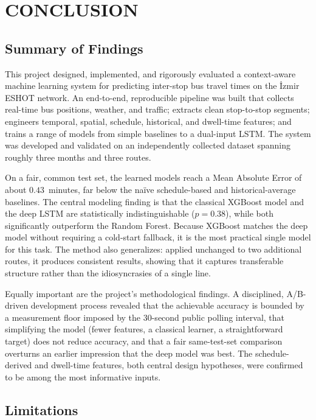 \chapter{CONCLUSION}

\section{Summary of Findings}

This project designed, implemented, and rigorously evaluated a context-aware machine learning system for predicting inter-stop bus travel times on the İzmir ESHOT network. An end-to-end, reproducible pipeline was built that collects real-time bus positions, weather, and traffic; extracts clean stop-to-stop segments; engineers temporal, spatial, schedule, historical, and dwell-time features; and trains a range of models from simple baselines to a dual-input LSTM. The system was developed and validated on an independently collected dataset spanning roughly three months and three routes.

On a fair, common test set, the learned models reach a Mean Absolute Error of about $0.43$~minutes, far below the naïve schedule-based and historical-average baselines. The central modeling finding is that the classical XGBoost model and the deep LSTM are statistically indistinguishable ($p = 0.38$), while both significantly outperform the Random Forest. Because XGBoost matches the deep model without requiring a cold-start fallback, it is the most practical single model for this task. The method also generalizes: applied unchanged to two additional routes, it produces consistent results, showing that it captures transferable structure rather than the idiosyncrasies of a single line.

Equally important are the project's methodological findings. A disciplined, A/B-driven development process revealed that the achievable accuracy is bounded by a measurement floor imposed by the 30-second public polling interval, that simplifying the model (fewer features, a classical learner, a straightforward target) does not reduce accuracy, and that a fair same-test-set comparison overturns an earlier impression that the deep model was best. The schedule-derived and dwell-time features, both central design hypotheses, were confirmed to be among the most informative inputs.

\section{Limitations}

